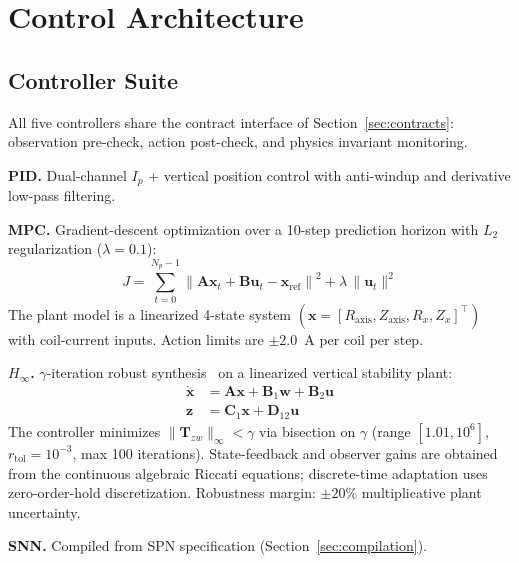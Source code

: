 \documentclass[twocolumn,preprintnumbers,amsmath,amssymb,prl,floatfix]{revtex4-2}
\begin{document}
\section{Control Architecture}
\label{sec:control}

\subsection{Controller Suite}

All five controllers share the contract interface of
Section~\ref{sec:contracts}: observation pre-check, action
post-check, and physics invariant monitoring.

\textbf{PID.}\quad
Dual-channel $I_p$ + vertical position control with anti-windup
and derivative low-pass filtering.

\textbf{MPC.}\quad
Gradient-descent optimization over a 10-step prediction horizon
with $L_2$ regularization ($\lambda = 0.1$):
%
\begin{equation}
  J = \sum_{t=0}^{N_p-1}
  \left\|\mathbf{A}\mathbf{x}_t + \mathbf{B}\mathbf{u}_t
  - \mathbf{x}_\mathrm{ref}\right\|^2
  + \lambda\,\|\mathbf{u}_t\|^2
\end{equation}
%
The plant model is a linearized 4-state system
$(\mathbf{x} = [R_\mathrm{axis}, Z_\mathrm{axis},
R_x, Z_x]^\top)$ with coil-current inputs.
Action limits are $\pm 2.0$~A per coil per step.

\textbf{$H_\infty$.}\quad
$\gamma$-iteration robust synthesis~\cite{zhou1996,glover1988}
on a linearized vertical stability plant:
%
\begin{align}
  \dot{\mathbf{x}} &= \mathbf{A}\mathbf{x}
  + \mathbf{B}_1\mathbf{w} + \mathbf{B}_2\mathbf{u}
  \label{eq:hinf_plant} \\
  \mathbf{z} &= \mathbf{C}_1\mathbf{x}
  + \mathbf{D}_{12}\mathbf{u}
  \label{eq:hinf_perf}
\end{align}
%
The controller minimizes $\|\mathbf{T}_{zw}\|_\infty < \gamma$
via bisection on $\gamma$ (range $[1.01, 10^6]$,
$r_\mathrm{tol} = 10^{-3}$, max 100 iterations).
State-feedback and observer gains are obtained from the
continuous algebraic Riccati equations; discrete-time
adaptation uses zero-order-hold discretization.
Robustness margin: $\pm 20\%$ multiplicative plant uncertainty.

\textbf{SNN.}\quad
Compiled from SPN specification
(Section~\ref{sec:compilation}).
\end{document}
